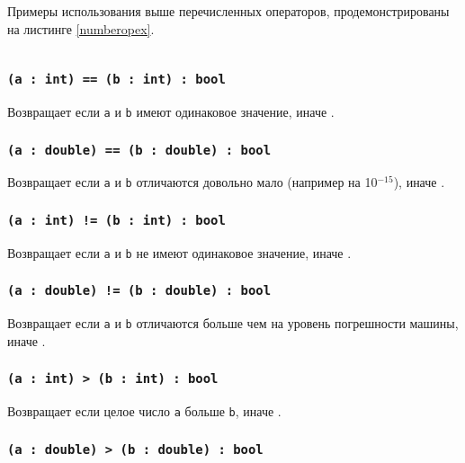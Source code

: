 Примеры использования выше перечисленных операторов, продемонстрированы на листинге \ref{numberopex}.

\begin{sourcecode}
	\label{numberopex}
	\inputminted[linenos]{icl}{../sources/numberopex.icL}
\end{sourcecode}

\subsubsection{\texttt{(a : int) == (b : int) : bool}}

Возвращает \true{} если \texttt{a} и \texttt{b} имеют одинаковое значение, иначе \false{}.

\subsubsection{\texttt{(a : double) == (b : double) : bool}}

Возвращает \true{} если \texttt{a} и \texttt{b} отличаются довольно мало (например на 10$^{-15}$), иначе \false{}.

\subsubsection{\texttt{(a : int) != (b : int) : bool}}

Возвращает \true{} если \texttt{a} и \texttt{b} не имеют одинаковое значение, иначе \false{}.

\subsubsection{\texttt{(a : double) != (b : double) : bool}}

Возвращает \true{} если \texttt{a} и \texttt{b} отличаются больше чем на уровень погрешности машины, иначе \false{}.

\subsubsection{\texttt{(a : int) > (b : int) : bool}}

Возвращает \true{} если целое число \texttt{a} больше \texttt{b}, иначе \false{}.

\subsubsection{\texttt{(a : double) > (b : double) : bool}}

